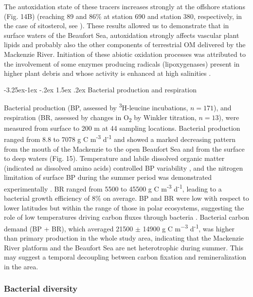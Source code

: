 \documentclass[essd, manuscript]{copernicus}
\makeatletter
\renewcommand\paragraph{\@startsection{paragraph}{4}{\z@}%
                                     {-3.25ex\@plus -1ex \@minus -.2ex}%
                                     {1.5ex \@plus .2ex}%
                                     {\normalfont\normalsize\bfseries}}
\makeatother
\begin{document}
The autoxidation state of these tracers increases strongly at the offshore stations (Fig. 14B) (reaching 89 and 86\% at station 690 and station 380, respectively, in the case of sitosterol, see \citep{Rontani2014}). These results allowed us to demonstrate that in surface waters of the Beaufort Sea, autoxidation strongly affects vascular plant lipids and probably also the other components of terrestrial OM delivered by the Mackenzie River. Initiation of these abiotic oxidation processes was attributed to the involvement of some enzymes producing radicals (lipoxygenases) present in higher plant debris and whose activity is enhanced at high salinities \citep{Galeron2018}. 

\paragraph{Bacterial production and respiration}

Bacterial production (BP, assessed by \textsuperscript{3}H-leucine incubations, $n = 171$), and respiration (BR, assessed by changes in O\textsubscript{2} by Winkler titration, $n = 13$), were measured from surface to 200 m at 44 sampling locations. Bacterial production ranged from 8.8 to 7078 \textmu g C m\textsuperscript{-3} d\textsuperscript{-1} and showed a marked decreasing pattern from the mouth of the Mackenzie to the open Beaufort Sea and from the surface to deep waters (Fig. 15). Temperature and labile dissolved organic matter (indicated as dissolved amino acids) controlled BP variability \citep{Ortega-Retuerta2012a}, and the nitrogen limitation of surface BP during the summer period was demonstrated experimentally \citep{Ortega-Retuerta2012b}. BR ranged from 5500 to 45500 \textmu g C m\textsuperscript{-3} d\textsuperscript{-1}, leading to a bacterial growth efficiency of 8\% on average. BP and BR were low with respect to lower latitudes but within the range of those in polar ecosystems, suggesting the role of low temperatures driving carbon fluxes through bacteria \citep{Kirchman2009}. Bacterial carbon demand (BP + BR), which averaged 21500 $\pm$ 14900 \textmu g C m\textsuperscript{−3} d\textsuperscript{-1}, was higher than primary production in the whole study area, indicating that the Mackenzie River platform and the Beaufort Sea are net heterotrophic during summer. This may suggest a temporal decoupling between carbon fixation and remineralization in the area.

\subsubsection{Bacterial diversity}
\end{document}
